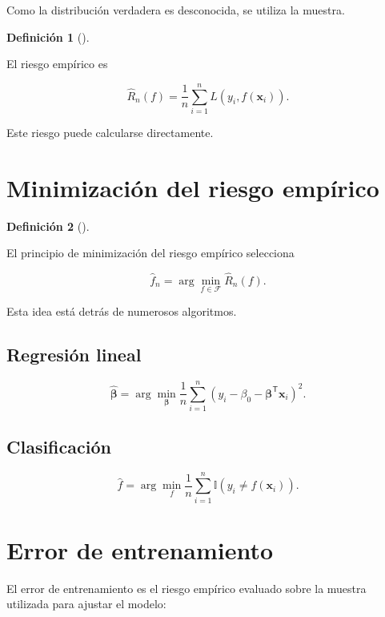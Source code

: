 \documentclass[
  spanish,
  11pt,
  letterpaper,
  DIV=11,
  numbers=noendperiod]{scrreprt}
\theoremstyle{definition}
\newtheorem{definition}{Definición}[chapter]
\theoremstyle{plain}
\theoremstyle{definition}
\theoremstyle{remark}
\begin{document}
Como la distribución verdadera es desconocida, se utiliza la muestra.

\begin{definition}[]\protect\hypertarget{def-riesgo-empirico}{}\label{def-riesgo-empirico}

El riesgo empírico es

\[
\widehat{R}_n(f)
=
\frac{1}{n}
\sum_{i=1}^{n}
L(
y_i,
f(\mathbf{x}_i)
).
\]

\end{definition}

Este riesgo puede calcularse directamente.

\section{Minimización del riesgo
empírico}\label{minimizaciuxf3n-del-riesgo-empuxedrico}

\begin{definition}[]\protect\hypertarget{def-erm}{}\label{def-erm}

El principio de minimización del riesgo empírico selecciona

\[
\widehat{f}_n
=
\arg\min_{f\in\mathcal{F}}
\widehat{R}_n(f).
\]

\end{definition}

Esta idea está detrás de numerosos algoritmos.

\subsection{Regresión lineal}\label{regresiuxf3n-lineal}

\[
\widehat{\boldsymbol{\beta}}
=
\arg\min_{\boldsymbol{\beta}}
\frac{1}{n}
\sum_{i=1}^{n}
(
y_i
-
\beta_0
-
\boldsymbol{\beta}^{\mathsf T}\mathbf{x}_i
)^2.
\]

\subsection{Clasificación}\label{clasificaciuxf3n}

\[
\widehat{f}
=
\arg\min_f
\frac{1}{n}
\sum_{i=1}^{n}
\mathbb{I}
(
y_i\neq f(\mathbf{x}_i)
).
\]

\section{Error de entrenamiento}\label{error-de-entrenamiento}

El error de entrenamiento es el riesgo empírico evaluado sobre la
muestra utilizada para ajustar el modelo:
\end{document}
